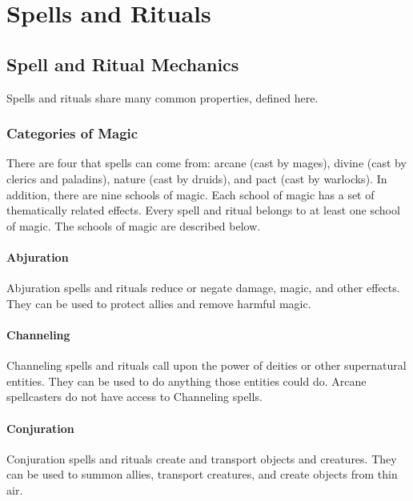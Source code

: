 \chapter{Spells and Rituals}\label{Spells and Rituals}

\section{Spell and Ritual Mechanics}\label{Spell and Ritual Mechanics}

    Spells and rituals share many common properties, defined here.

    \subsection{Categories of Magic}
        There are four  that spells can come from: arcane (cast by mages), divine (cast by clerics and paladins), nature (cast by druids), and pact (cast by warlocks).
        In addition, there are nine schools of magic.
        Each school of magic has a set of thematically related effects.
        Every spell and ritual belongs to at least one school of magic.
        The schools of magic are described below.

        \subsubsection{Abjuration}
            Abjuration spells and rituals reduce or negate damage, magic, and other effects.
            They can be used to protect allies and remove harmful magic.

        \subsubsection{Channeling}
            Channeling spells and rituals call upon the power of deities or other supernatural entities.
            They can be used to do anything those entities could do.
            Arcane spellcasters do not have access to Channeling spells.

        \subsubsection{Conjuration}
            Conjuration spells and rituals create and transport objects and creatures.
            They can be used to summon allies, transport creatures, and create objects from thin air.

